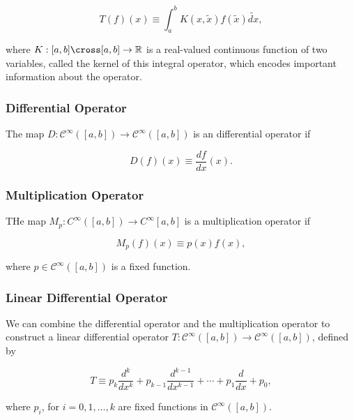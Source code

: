 \documentclass[a4paper,12pt]{report}
\begin{document}
\begin{equation}
    T(f)(x) \equiv \int_{a}^{b} K(x,\tilde{x} )f(\tilde{x} )\tilde{dx} , 
\end{equation}

where \(K:[a,b]\cross [a,b] \to \mathbb{R}\) is a real-valued continuous function of two variables, called the kernel of this integral operator, which encodes important information about the operator. 

\subsubsection{Differential Operator}

The map \(D:\mathcal{C}^{\infty}([a,b]) \to \mathcal{C}^{\infty}([a,b])  \) is an differential operator if 

\begin{equation}
    D(f)(x) \equiv \frac{df}{dx} (x). 
\end{equation}

\subsubsection{Multiplication Operator}

THe map \(M_{p}:C^{\infty}([a,b]) \to C^{\infty}[a,b]   \) is a multiplication operator if 

\begin{equation}
    M_{p}(f)(x) \equiv p(x)f(x), 
\end{equation}

where \(p \in \mathcal{C}^{\infty}([a,b]) \) is a fixed function. 

\subsubsection{Linear Differential Operator}

We can combine the differential operator and the multiplication operator to construct a linear differential operator \(T:\mathcal{C}^{\infty}([a,b]) \to \mathcal{C}^{\infty}([a,b])  \), defined by 

\begin{equation}
    T \equiv p_{k} \frac{d^{k} }{dx^{k} } + p_{k-1} \frac{d^{k-1}}{dx^{k-1} } + \cdots + p_1 \frac{d}{dx} + p_0 ,    
\end{equation}

where \(p_{i} \), for \(i = 0, 1, \ldots ,k\) are fixed functions in \(\mathcal{C}^{\infty}([a,b]) \).    
\end{document}
